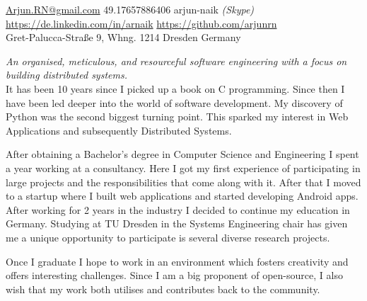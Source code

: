 \documentclass[10pt,a4paper]{article}
\begin{document}
\sloppy  %


\nobreakvspace{0.3em}  %

\noindent\href{mailto:Arjun.RN@gmail.com}{Arjun.RN\mbox{}@\mbox{}gmail.com}\sbull
\textsmaller{+}49.17657886406
\sbull arjun-naik \emph{(Skype)}
\\
\sbull
\href{https://de.linkedin.com/in/arnaik}{https://de.linkedin.com/in/arnaik}
\sbull
\href{https://github.com/arjunrn}{https://github.com/arjunrn}
\\
Gret-Palucca-Stra{\ss}e 9, Whng. 1214\sbull
Dresden\sbull
Germany

\spacedhrule{0.9em}{-0.4em}  %


\vspace{-1.3em}  %
\begin{multicols}{2}  %
\noindent \emph{An organised, meticulous, and resourceful software engineering with a focus on building distributed systems.}
\\
It has been 10 years since I picked up a book on C programming. Since then I have been led deeper into the world of software development. My discovery of Python was the second biggest turning point. This sparked my interest in Web Applications and subsequently Distributed Systems. 

After obtaining a Bachelor's degree in Computer Science and Engineering I spent a year working at a consultancy. Here I got my first experience of participating in large projects and the responsibilities that come along with it. After that I moved to a startup where I built web applications and started developing Android apps. After working for 2 years in the industry I decided to continue my education in Germany. Studying at TU Dresden in the Systems Engineering chair has given me a unique opportunity to participate is several diverse research projects.

Once I graduate I hope to work in an environment which fosters creativity and offers interesting challenges. Since I am a big proponent of open-source, I also wish that my work both utilises and contributes back to the community.

\end{multicols}
\end{document}
